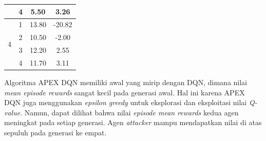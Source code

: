 \begin{table}[H]
\begin{tabular}{|c|c|c|c|}
                                                                              & 4                                                                            & 5.50                                                                                                  & 3.26                                                                                                  \\ \hline
  \multirow{4}{*}{4}                                                           & 1                                                                            & 13.80                                                                                                 & -20.82                                                                                                \\ \cline{2-4} 
                                                                              & 2                                                                            & 10.50                                                                                                 & -2.00                                                                                                 \\ \cline{2-4} 
                                                                              & 3                                                                            & 12.20                                                                                                 & 2.55                                                                                                  \\ \cline{2-4} 
                                                                              & 4                                                                            & 11.70                                                                                                 & 3.11                                                                                                  \\ \hline
  \end{tabular}
\end{table}

Algoritma APEX DQN memiliki awal yang mirip dengan DQN, dimana nilai \emph{mean episode rewards} sangat kecil pada generasi awal.
Hal ini karena APEX DQN juga menggunakan \emph{epsilon greedy} untuk eksplorasi dan eksploitasi nilai \emph{Q-value}.
Namun, dapat dilihat bahwa nilai \emph{episode mean rewards} kedua agen meningkat pada setiap generasi.
Agen \emph{attacker} mampu mendapatkan nilai di atas sepuluh pada generasi ke empat.

